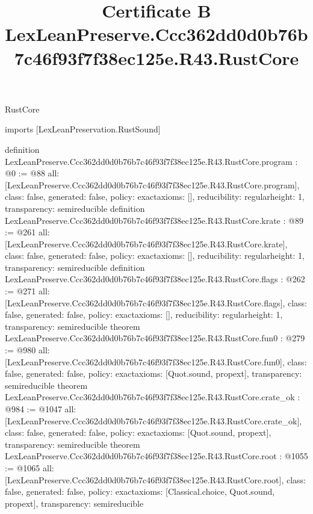 \begin{lexlean}{RustCore}
\title{Certificate B LexLeanPreserve.Ccc362dd0d0b76b7c46f93f7f38ec125e.R43.RustCore}
\begin{coremodule}
imports [LexLeanPreservation.RustSound]

definition LexLeanPreserve.Ccc362dd0d0b76b7c46f93f7f38ec125e.R43.RustCore.program : @0 := @88 {
  all: [LexLeanPreserve.Ccc362dd0d0b76b7c46f93f7f38ec125e.R43.RustCore.program],
  class: false,
  generated: false,
  policy: exact{axioms: []},
  reducibility: regular{height: 1},
  transparency: semireducible
}
definition LexLeanPreserve.Ccc362dd0d0b76b7c46f93f7f38ec125e.R43.RustCore.krate : @89 := @261 {
  all: [LexLeanPreserve.Ccc362dd0d0b76b7c46f93f7f38ec125e.R43.RustCore.krate],
  class: false,
  generated: false,
  policy: exact{axioms: []},
  reducibility: regular{height: 1},
  transparency: semireducible
}
definition LexLeanPreserve.Ccc362dd0d0b76b7c46f93f7f38ec125e.R43.RustCore.flags : @262 := @271 {
  all: [LexLeanPreserve.Ccc362dd0d0b76b7c46f93f7f38ec125e.R43.RustCore.flags],
  class: false,
  generated: false,
  policy: exact{axioms: []},
  reducibility: regular{height: 1},
  transparency: semireducible
}
theorem LexLeanPreserve.Ccc362dd0d0b76b7c46f93f7f38ec125e.R43.RustCore.fun0 : @279 := @980 {
  all: [LexLeanPreserve.Ccc362dd0d0b76b7c46f93f7f38ec125e.R43.RustCore.fun0],
  class: false,
  generated: false,
  policy: exact{axioms: [Quot.sound, propext]},
  transparency: semireducible
}
theorem LexLeanPreserve.Ccc362dd0d0b76b7c46f93f7f38ec125e.R43.RustCore.crate_ok : @984 := @1047 {
  all: [LexLeanPreserve.Ccc362dd0d0b76b7c46f93f7f38ec125e.R43.RustCore.crate_ok],
  class: false,
  generated: false,
  policy: exact{axioms: [Quot.sound, propext]},
  transparency: semireducible
}
theorem LexLeanPreserve.Ccc362dd0d0b76b7c46f93f7f38ec125e.R43.RustCore.root : @1055 := @1065 {
  all: [LexLeanPreserve.Ccc362dd0d0b76b7c46f93f7f38ec125e.R43.RustCore.root],
  class: false,
  generated: false,
  policy: exact{axioms: [Classical.choice, Quot.sound, propext]},
  transparency: semireducible
}


\end{coremodule}
\end{lexlean}
